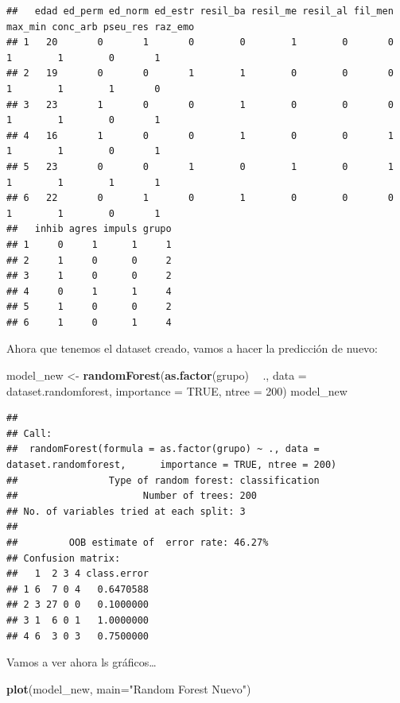 \documentclass[]{article}
\newenvironment{Shaded}{\begin{snugshade}}{\end{snugshade}}
\newcommand{\KeywordTok}[1]{\textcolor[rgb]{0.13,0.29,0.53}{\textbf{#1}}}
\newcommand{\DataTypeTok}[1]{\textcolor[rgb]{0.13,0.29,0.53}{#1}}
\newcommand{\DecValTok}[1]{\textcolor[rgb]{0.00,0.00,0.81}{#1}}
\newcommand{\StringTok}[1]{\textcolor[rgb]{0.31,0.60,0.02}{#1}}
\newcommand{\OtherTok}[1]{\textcolor[rgb]{0.56,0.35,0.01}{#1}}
\newcommand{\OperatorTok}[1]{\textcolor[rgb]{0.81,0.36,0.00}{\textbf{#1}}}
\newcommand{\NormalTok}[1]{#1}
\begin{document}
\begin{verbatim}
##   edad ed_perm ed_norm ed_estr resil_ba resil_me resil_al fil_men max_min conc_arb pseu_res raz_emo
## 1   20       0       1       0        0        1        0       0       1        1        0       1
## 2   19       0       0       1        1        0        0       0       1        1        1       0
## 3   23       1       0       0        1        0        0       0       1        1        0       1
## 4   16       1       0       0        1        0        0       1       1        1        0       1
## 5   23       0       0       1        0        1        0       1       1        1        1       1
## 6   22       0       1       0        1        0        0       0       1        1        0       1
##   inhib agres impuls grupo
## 1     0     1      1     1
## 2     1     0      0     2
## 3     1     0      0     2
## 4     0     1      1     4
## 5     1     0      0     2
## 6     1     0      1     4
\end{verbatim}

Ahora que tenemos el dataset creado, vamos a hacer la predicción de
nuevo:

\begin{Shaded}
\begin{Highlighting}[]
\NormalTok{model_new <-}\StringTok{ }\KeywordTok{randomForest}\NormalTok{(}\KeywordTok{as.factor}\NormalTok{(grupo) }\OperatorTok{~}\StringTok{ }\NormalTok{., }\DataTypeTok{data =}\NormalTok{ dataset.randomforest, }\DataTypeTok{importance =} \OtherTok{TRUE}\NormalTok{, }\DataTypeTok{ntree =} \DecValTok{200}\NormalTok{)}
\NormalTok{model_new}
\end{Highlighting}
\end{Shaded}

\begin{verbatim}
## 
## Call:
##  randomForest(formula = as.factor(grupo) ~ ., data = dataset.randomforest,      importance = TRUE, ntree = 200) 
##                Type of random forest: classification
##                      Number of trees: 200
## No. of variables tried at each split: 3
## 
##         OOB estimate of  error rate: 46.27%
## Confusion matrix:
##   1  2 3 4 class.error
## 1 6  7 0 4   0.6470588
## 2 3 27 0 0   0.1000000
## 3 1  6 0 1   1.0000000
## 4 6  3 0 3   0.7500000
\end{verbatim}

Vamos a ver ahora ls gráficos\ldots{}

\begin{Shaded}
\begin{Highlighting}[]
\KeywordTok{plot}\NormalTok{(model_new, }\DataTypeTok{main=}\StringTok{"Random Forest Nuevo"}\NormalTok{)}
\end{Highlighting}
\end{Shaded}
\end{document}
